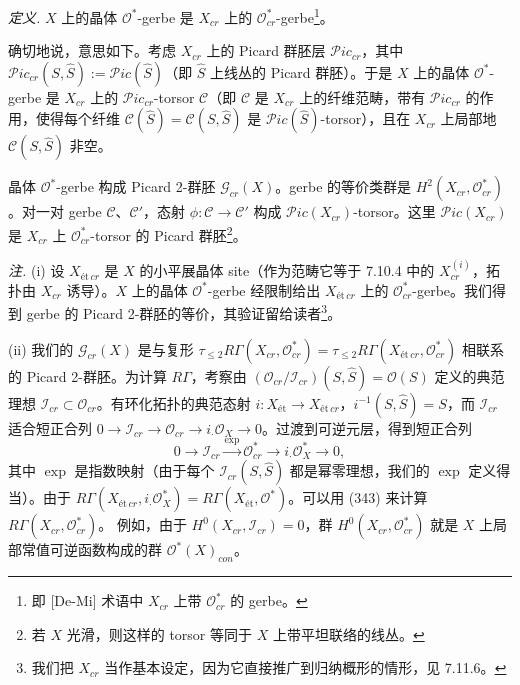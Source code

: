  \emph{定义.} $X$ 上的晶体 $\mathcal{O}^{*}$-gerbe 是 $X_{cr}$ 上的 $\mathcal{O}^{*}_{cr}$-gerbe\footnote{即 [De-Mi] 术语中 $X_{cr}$ 上带 $\mathcal{O}^{*}_{cr}$ 的 gerbe。}。

确切地说，意思如下。考虑 $X_{cr}$ 上的 Picard 群胚层 $\mathcal{P}ic_{cr}$，其中 $\mathcal{P}ic_{cr}(S,\hat S):=\mathcal{P}ic(\hat S)$（即 $\hat S$ 上线丛的 Picard 群胚）。于是 $X$ 上的晶体 $\mathcal{O}^{*}$-gerbe 是 $X_{cr}$ 上的 $\mathcal{P}ic_{cr}$-torsor $\mathcal{C}$（即 $\mathcal{C}$ 是 $X_{cr}$ 上的纤维范畴，带有 $\mathcal{P}ic_{cr}$ 的作用，使得每个纤维 $\mathcal{C}(\hat S)=\mathcal{C}(S,\hat S)$ 是 $\mathcal{P}ic(\hat S)$-torsor），且在 $X_{cr}$ 上局部地 $\mathcal{C}(S,\hat S)$ 非空。

晶体 $\mathcal{O}^{*}$-gerbe 构成 Picard 2-群胚 $\mathcal{G}_{cr}(X)$。gerbe 的等价类群是 $H^{2}(X_{cr},\mathcal{O}^{*}_{cr})$。对一对 gerbe $\mathcal{C}$、$\mathcal{C}'$，态射 $\phi:\mathcal{C}\to\mathcal{C}'$ 构成 $\mathcal{P}ic(X_{cr})$-torsor。这里 $\mathcal{P}ic(X_{cr})$ 是 $X_{cr}$ 上 $\mathcal{O}^{*}_{cr}$-torsor 的 Picard 群胚\footnote{若 $X$ 光滑，则这样的 torsor 等同于 $X$ 上带平坦联络的线丛。}。

 \emph{注.} (i) 设 $X_{\text{ét}\,cr}$ 是 $X$ 的小平展晶体 site（作为范畴它等于 7.10.4 中的 $X^{(i)}_{cr}$，拓扑由 $X_{cr}$ 诱导）。$X$ 上的晶体 $\mathcal{O}^{*}$-gerbe 经限制给出 $X_{\text{ét}\,cr}$ 上的 $\mathcal{O}^{*}_{cr}$-gerbe。我们得到 gerbe 的 Picard 2-群胚的等价，其验证留给读者\footnote{我们把 $X_{cr}$ 当作基本设定，因为它直接推广到归纳概形的情形，见 7.11.6。}。

(ii) 我们的 $\mathcal{G}_{cr}(X)$ 是与复形 $\tau_{\leq2}R\Gamma(X_{cr},\mathcal{O}^{*}_{cr})=\tau_{\leq2}R\Gamma(X_{\text{ét}\,cr},\mathcal{O}^{*}_{cr})$ 相联系的 Picard 2-群胚。为计算 $R\Gamma$，考察由 $(\mathcal{O}_{cr}/\mathcal{I}_{cr})(S,\hat S)=\mathcal{O}(S)$ 定义的典范理想 $\mathcal{I}_{cr}\subset\mathcal{O}_{cr}$。有环化拓扑的典范态射 $i:X_{\text{ét}}\to X_{\text{ét}\,cr}$，$i^{-1}(S,\hat S)=S$，而 $\mathcal{I}_{cr}$ 适合短正合列 $0\to\mathcal{I}_{cr}\to\mathcal{O}_{cr}\to i_{\cdot}\mathcal{O}_{X}\to 0$。过渡到可逆元层，得到短正合列
\begin{equation}\tag{342}
0\longrightarrow\mathcal{I}_{cr}\xrightarrow{\exp}\mathcal{O}^{*}_{cr}\longrightarrow i_{\cdot}\mathcal{O}^{*}_{X}\longrightarrow 0,
\end{equation}
其中 $\exp$ 是指数映射（由于每个 $\mathcal{I}_{cr}(S,\hat S)$ 都是幂零理想，我们的 $\exp$ 定义得当）。由于 $R\Gamma(X_{\text{ét}\,cr},i_{\cdot}\mathcal{O}^{*}_{X})=R\Gamma(X_{\text{ét}},\mathcal{O}^{*})$。可以用 (343) 来计算 $R\Gamma(X_{cr},\mathcal{O}^{*}_{cr})$。%
例如，由于 $H^{0}(X_{cr},\mathcal{I}_{cr})=0$，群 $H^{0}(X_{cr},\mathcal{O}^{*}_{cr})$ 就是 $X$ 上局部常值可逆函数构成的群 $\mathcal{O}^{*}(X)_{con}$。

